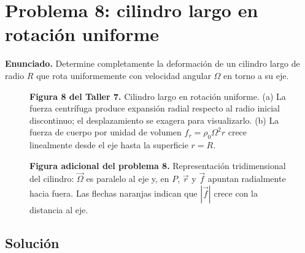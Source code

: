\documentclass[a4paper]{article}
\begin{document}
\section{Problema 8: cilindro largo en rotación uniforme}

\textbf{Enunciado.} Determine completamente la deformación de un cilindro largo de radio $R$ que rota uniformemente con velocidad angular $\Omega$ en torno a su eje.

\begin{figure}[H]
\centering

\par\medskip
\begin{minipage}{\textwidth}
\textbf{Figura 8 del Taller 7.} Cilindro largo en rotación uniforme. (a) La fuerza centrífuga produce expansión radial respecto al radio inicial discontinuo; el desplazamiento se exagera para visualizarlo. (b) La fuerza de cuerpo por unidad de volumen $f_r=\rho_0\Omega^2r$ crece linealmente desde el eje hasta la superficie $r=R$.
\end{minipage}
\end{figure}

\begin{figure}[H]
\centering
\resizebox{0.84\textwidth}{!}{}
\par\medskip
\begin{minipage}{\textwidth}
\textbf{Figura adicional del problema 8.} Representación tridimensional del cilindro: $\vec\Omega$ es paralelo al eje y, en $P$, $\vec r$ y $\vec f$ apuntan radialmente hacia fuera. Las flechas naranjas indican que $|\vec f|$ crece con la distancia al eje.
\end{minipage}
\end{figure}

\subsection{Solución}
\end{document}
